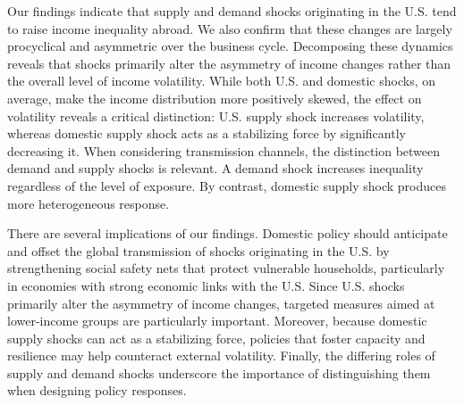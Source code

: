 \documentclass[12pt, a4paper]{article}
\begin{document}
Our findings indicate that supply and demand shocks originating in the U.S. tend to raise income inequality abroad. We also confirm that these changes are largely procyclical and asymmetric over the business cycle. Decomposing these dynamics reveals that shocks primarily alter the asymmetry of income changes rather than the overall level of income volatility. While both U.S. and domestic shocks, on average, make the income distribution more positively skewed, the effect on volatility reveals a critical distinction: U.S. supply shock increases volatility, whereas domestic supply shock acts as a stabilizing force by significantly decreasing it. When considering transmission channels, the distinction between demand and supply shocks is relevant. A demand shock increases inequality regardless of the level of exposure. By contrast, domestic supply shock produces more heterogeneous response.

There are several implications of our findings. Domestic policy should anticipate and offset the global transmission of shocks originating in the U.S. by strengthening social safety nets that protect vulnerable households, particularly in economies with strong economic links with the U.S. Since U.S. shocks primarily alter the asymmetry of income changes, targeted measures aimed at lower-income groups are particularly important. Moreover, because domestic supply shocks can act as a stabilizing force, policies that foster capacity and resilience may help counteract external volatility. Finally, the differing roles of supply and demand shocks underscore the importance of distinguishing them when designing policy responses.
\end{document}
